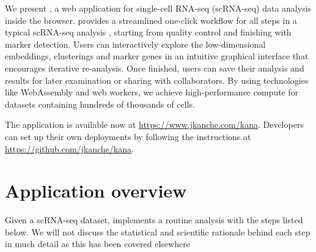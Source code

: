 \documentclass{article}
\begin{document}
We present , a web application for single-cell RNA-seq (scRNA-seq) data analysis inside the browser.
 provides a streamlined one-click workflow for all steps in a typical scRNA-seq analysis \cite{amezquita2020orchestrating}, 
starting from quality control and finishing with marker detection.
Users can interactively explore the low-dimensional embeddings, clusterings and marker genes in an intuitive graphical interface that encourages iterative re-analysis.
Once finished, users can save their analysis and results for later examination or sharing with collaborators.
By using technologies like WebAssembly and web workers, we achieve high-performance compute for datasets containing hundreds of thousands of cells.

The  application is available now at \url{https://www.jkanche.com/kana}.
Developers can set up their own deployments by following the instructions at \url{https://github.com/jkanche/kana}.

\section{Application overview}

Given a scRNA-seq dataset,  implements a routine analysis with the steps listed below.
We will not discuss the statistical and scientific rationale behind each step in much detail as this has been covered elsewhere \cite{oscabook} 
\end{document}
